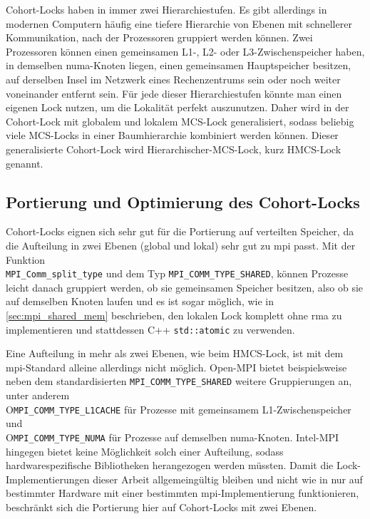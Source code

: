 Cohort-Locks haben in \cite{Cohort-Lock} immer zwei Hierarchiestufen.
Es gibt allerdings in modernen Computern häufig eine tiefere Hierarchie von Ebenen
mit schnellerer Kommunikation,
nach der Prozessoren gruppiert werden können.
Zwei Prozessoren können einen gemeinsamen L1-, L2- oder L3-\gls{Zwischenspeicher} haben,
in demselben \gls{numa}-Knoten liegen,
einen gemeinsamen Hauptspeicher besitzen,
auf derselben Insel im Netzwerk eines Rechenzentrums sein
oder noch weiter voneinander entfernt sein.
Für jede dieser Hierarchiestufen könnte man einen eigenen Lock nutzen,
um die Lokalität perfekt auszunutzen.
Daher wird in \cite{HMCS-Lock} der Cohort-Lock mit globalem und lokalem MCS-Lock generalisiert,
sodass beliebig viele MCS-Locks in einer Baumhierarchie kombiniert werden können.
Dieser generalisierte Cohort-Lock wird Hierarchischer-MCS-Lock, kurz HMCS-Lock genannt.

\subsection{Portierung und Optimierung des Cohort-Locks}
\label{sec:cohort_opt}

Cohort-Locks eignen sich sehr gut für die Portierung auf verteilten Speicher,
da die Aufteilung in zwei Ebenen (global und lokal) sehr gut zu \gls{mpi} passt.
Mit der Funktion\\\texttt{MPI\_Comm\_split\_type} und dem Typ \texttt{MPI\_COMM\_TYPE\_SHARED},
können Prozesse leicht danach gruppiert werden,
ob sie gemeinsamen Speicher besitzen,
also ob sie auf demselben Knoten laufen
und es ist sogar möglich,
wie in \autoref{sec:mpi_shared_mem} beschrieben,
den lokalen Lock komplett ohne \gls{rma} zu implementieren
und stattdessen C++ \texttt{std::atomic} zu verwenden.

Eine Aufteilung in mehr als zwei Ebenen,
wie beim HMCS-Lock,
ist mit dem \gls{mpi}-Standard alleine allerdings nicht möglich.
Open-MPI bietet beispielsweise neben dem standardisierten \texttt{MPI\_COMM\_TYPE\_SHARED} weitere Gruppierungen an,
unter anderem\\O\texttt{MPI\_COMM\_TYPE\_L1CACHE} für Prozesse mit gemeinsamem L1-\gls{Zwischenspeicher}
und\\O\texttt{MPI\_COMM\_TYPE\_NUMA} für Prozesse auf demselben \gls{numa}-Knoten.
Intel-MPI hingegen bietet keine Möglichkeit solch einer Aufteilung,
sodass hardwarespezifische Bibliotheken herangezogen werden müssten.
Damit die Lock-Implementierungen dieser Arbeit allgemeingültig bleiben
und nicht wie in \cite{RMA-RW} nur auf bestimmter Hardware mit einer bestimmten \gls{mpi}-Implementierung funktionieren,
beschränkt sich die Portierung hier auf Cohort-Locks mit zwei Ebenen.

